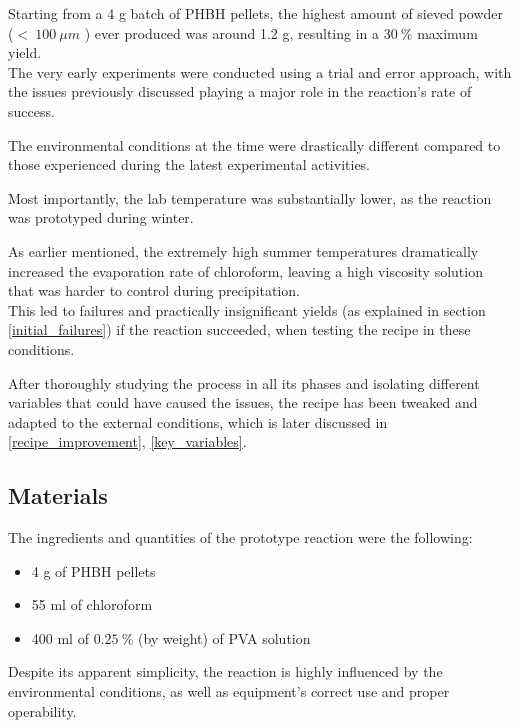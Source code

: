 \documentclass{article}
\begin{document}
    Starting from a 4 g batch of PHBH pellets, the highest amount of sieved powder ($ < \ 100 \ \mu m$ )
    ever produced was around 1.2 g, resulting in a $30 \ \% $ maximum yield. \\ 

    The very early experiments were conducted using a trial and error approach, with the issues previously discussed 
    playing a major role in the reaction's rate of success. 
    
    The environmental conditions at the time were drastically different compared to those experienced during the latest experimental 
    activities. 

    Most importantly, the lab temperature was substantially lower, as the reaction was prototyped during winter. 
    
    As earlier mentioned, the extremely high summer temperatures dramatically increased the evaporation rate of 
    chloroform, leaving a high viscosity solution that was harder to control during precipitation. \\

    This led to failures and practically insignificant yields (as explained in section \ref{initial_failures}) if 
    the reaction succeeded, when testing the recipe in these conditions.  

    After thoroughly studying the process in all its phases and isolating different variables that could have caused the issues, 
    the recipe has been tweaked and adapted to the external conditions, which is later discussed 
    in \ref{recipe_improvement}, \ref{key_variables}. 

        \subsection{Materials\label{Components}}

        The ingredients and quantities of the prototype reaction were the following: 

            \begin{itemize}
                \item 4 g of PHBH pellets 
                \item 55 ml of chloroform 
                \item 400 ml of $0.25 \ \% $ (by weight) of PVA solution 
            \end{itemize} 
        

        Despite its apparent simplicity, the reaction is highly influenced by the environmental conditions, as well as
        equipment's correct use and proper operability. \\ 
        
\end{document}

